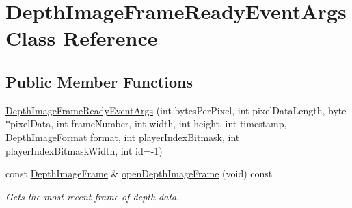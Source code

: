 \hypertarget{class_depth_image_frame_ready_event_args}{\section{\-Depth\-Image\-Frame\-Ready\-Event\-Args \-Class \-Reference}
\label{class_depth_image_frame_ready_event_args}
}
\subsection*{\-Public \-Member \-Functions}
\begin{DoxyCompactItemize}
\item 
\hyperlink{class_depth_image_frame_ready_event_args_a0f54c219ce8d996b37bd2b5beedcae09}{\-Depth\-Image\-Frame\-Ready\-Event\-Args} (int bytes\-Per\-Pixel, int pixel\-Data\-Length, byte $\ast$pixel\-Data, int frame\-Number, int width, int height, int timestamp, \hyperlink{depth_image_format_8h_a00bd0eac7784357ebca4c1e6a50b51af}{\-Depth\-Image\-Format} format, int player\-Index\-Bitmask, int player\-Index\-Bitmask\-Width, int id=-\/1)
\item 
const \hyperlink{class_depth_image_frame}{\-Depth\-Image\-Frame} \& \hyperlink{class_depth_image_frame_ready_event_args_a637316dcf0710591053a4045a16b0c23}{open\-Depth\-Image\-Frame} (void) const 
\begin{DoxyCompactList}\small\item\em \-Gets the most recent frame of depth data. \end{DoxyCompactList}\end{DoxyCompactItemize}


